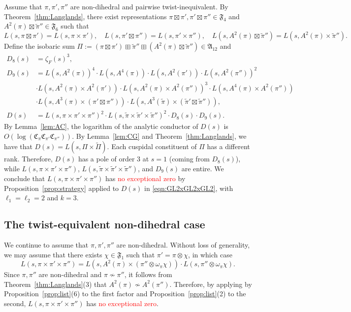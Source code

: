 \documentclass[11pt]{amsart}
\theoremstyle{remark}
\renewcommand{\tilde}{\widetilde}
\numberwithin{equation}{section}
\begin{document}
Assume that $\pi,\pi',\pi''$ are non-dihedral and pairwise twist-inequivalent.  By Theorem~\ref{thm:Langlands}, there exist representations $\pi\boxtimes\pi',\pi'\boxtimes\pi''\in\mathfrak{F}_4$ and $A^2(\pi)\boxtimes\tilde{\pi}''\in\mathfrak{F}_6$ such that
\[
L(s,\pi\boxtimes\pi')=L(s,\pi\times\pi'),\quad L(s,\pi'\boxtimes\pi'')=L(s,\pi'\times\pi''), \quad L(s,A^2(\pi)\boxtimes\tilde{\pi}'')=L(s,A^2(\pi)\times\tilde{\pi}'').
\]
Define the isobaric sum $\Pi := (\pi \boxtimes \pi') \boxplus \widetilde{\pi}'' \boxplus (A^2(\pi) \boxtimes \widetilde{\pi}'')\in\mathfrak{A}_{12}$ and
\begin{equation}
\label{eqn:GL2xGL2xGL2}
\begin{aligned}
D_8(s) &= \zeta_F(s)^3,  \\
D_9(s) &= L(s,A^2(\pi))^4 \cdot L(s,A^4(\pi))\cdot L(s,A^2(\pi'))\cdot L(s,A^2(\pi''))^2 \\
    & \cdot L(s,A^2(\pi)\times A^2(\pi'))\cdot L(s,A^2(\pi)\times A^2(\pi''))^3\cdot L(s,A^4(\pi)\times A^2(\pi''))\\
    &\cdot L(s,A^3(\pi)\times(\pi'\boxtimes\pi''))\cdot L(s,A^3(\widetilde{\pi})\times(\tilde{\pi}'\boxtimes\tilde{\pi}'')),\\
D(s)&=L(s,\pi \times \pi' \times \pi'')^2 \cdot L(s,\widetilde\pi \times \widetilde{\pi}' \times \widetilde{\pi}'')^2 \cdot D_8(s) \cdot D_9(s).
\end{aligned}
\end{equation}
By Lemma~\ref{lem:AC}, the logarithm of the analytic conductor of $D(s)$ is $O(\log(\mathfrak{C}_{\pi}\mathfrak{C}_{\pi'}\mathfrak{C}_{\pi''}))$. By Lemma~\ref{lem:CG} and Theorem~\ref{thm:Langlands}, we have that $D(s)=L(s,\Pi\times\tilde{\Pi})$.  Each cuspidal constituent of $\Pi$ has a different rank.  Therefore, $D(s)$ has a pole of order 3 at $s=1$ (coming from $D_8(s)$), while $L(s,\pi \times \pi' \times \pi'')$, $L(s,\tilde{\pi} \times \tilde{\pi}' \times \tilde{\pi}'')$, and $D_9(s)$ are entire.  We conclude that $L(s,\pi\times\pi'\times\pi'')$ has \textcolor{red}{no exceptional zero} by Proposition~\ref{prop:strategy} applied to $D(s)$ in \eqref{eqn:GL2xGL2xGL2}, with $\ell_1 = \ell_2 = 2$ and $k=3$.

\subsection{The twist-equivalent non-dihedral case}
We continue to assume that $\pi,\pi',\pi''$ are non-dihedral.  Without loss of generality, we may assume that there exists $\chi\in\mathfrak{F}_1$ such that $\pi' = \pi \otimes \chi$, in which case
\[
L(s,\pi \times \pi' \times \pi'') = L(s,A^2(\pi) \times (\pi'' \otimes \omega_\pi\chi)) \cdot L(s,\pi'' \otimes \omega_\pi\chi).
\]
Since $\pi,\pi''$ are non-dihedral and $\pi \not\sim \pi''$, it follows from Theorem~\ref{thm:Langlands}(3) that $A^2(\pi) \not\sim A^2(\pi'')$. Therefore, by applying by Proposition~\ref{prop:list}(6) to the first factor and Proposition~\ref{prop:list}(2) to the second, $L(s,\pi \times \pi' \times \pi'')$ has \textcolor{red}{no exceptional zero}.
\end{document}
